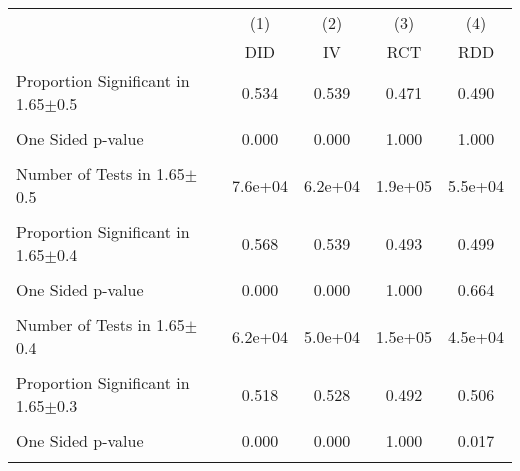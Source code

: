 {
\def\sym#1{\ifmmode^{#1}\else\(^{#1}\)\fi}
\begin{tabular}{l*{4}{c}}
\hline\hline
                &\multicolumn{1}{c}{(1)}&\multicolumn{1}{c}{(2)}&\multicolumn{1}{c}{(3)}&\multicolumn{1}{c}{(4)}\\
                &\multicolumn{1}{c}{DID}&\multicolumn{1}{c}{IV}&\multicolumn{1}{c}{RCT}&\multicolumn{1}{c}{RDD}\\
\hline
\hline Proportion Significant in 1.65$\pm$0.5&    0.534         &    0.539         &    0.471         &    0.490         \\
                &                  &                  &                  &                  \\
One Sided p-value&    0.000         &    0.000         &    1.000         &    1.000         \\
                &                  &                  &                  &                  \\
Number of Tests in 1.65$\pm$0.5&  7.6e+04         &  6.2e+04         &  1.9e+05         &  5.5e+04         \\
                &                  &                  &                  &                  \\
\hline Proportion Significant in 1.65$\pm$0.4&    0.568         &    0.539         &    0.493         &    0.499         \\
                &                  &                  &                  &                  \\
One Sided p-value&    0.000         &    0.000         &    1.000         &    0.664         \\
                &                  &                  &                  &                  \\
Number of Tests in 1.65$\pm$0.4&  6.2e+04         &  5.0e+04         &  1.5e+05         &  4.5e+04         \\
                &                  &                  &                  &                  \\
\hline Proportion Significant in 1.65$\pm$0.3&    0.518         &    0.528         &    0.492         &    0.506         \\
                &                  &                  &                  &                  \\
One Sided p-value&    0.000         &    0.000         &    1.000         &    0.017         \\
                &                  &                  &                  &                  \\

\end{tabular}}
